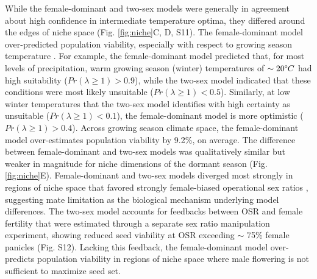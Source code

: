 \documentclass[9pt,twocolumn,twoside,lineno]{pnas-new}
\newcommand{\revise}[1]{{\color{Mahogany}{#1}}}
\begin{document}
While the female-dominant and two-sex models were generally in agreement about high confidence in intermediate temperature optima, they differed around the edges of niche space (Fig. \ref{fig:niche}C, D, S11). 
The female-dominant model over-predicted population viability, especially with respect to growing season temperature \revise {(Fig. \ref{fig:niche}E, F)}. 
For example, the female-dominant model predicted that, for most levels of precipitation, warm growing season (winter) temperatures of $\sim 20\degree C$ had high suitability ($Pr(\lambda \ge 1) > 0.9$), while the two-sex model indicated that these conditions were most likely unsuitable ($Pr(\lambda \ge 1) < 0.5$). 
Similarly, at low winter temperatures that the two-sex model identifies with high certainty as unsuitable ($Pr(\lambda \ge 1) < 0.1$), the female-dominant model is more optimistic ($Pr(\lambda \ge 1) > 0.4$). 
Across growing season climate space, the female-dominant model over-estimates population viability by 9.2\%, on average. 
The difference between female-dominant and two-sex models was qualitatively similar but weaker in magnitude for niche dimensions of the dormant season (Fig. \ref{fig:niche}E).
Female-dominant and two-sex models diverged most strongly in regions of niche space that favored strongly female-biased operational sex ratios \revise {(Fig. S16 to S19)}, suggesting mate limitation as the biological mechanism underlying model differences. 
The two-sex model accounts for feedbacks between OSR and female fertility that were estimated through a separate sex ratio manipulation experiment, showing reduced seed viability at OSR exceeding $\sim$ 75\% female panicles (Fig. S12).
Lacking this feedback, the female-dominant model over-predicts population viability in regions of niche space where male flowering is not sufficient to maximize seed set. 
\end{document}
